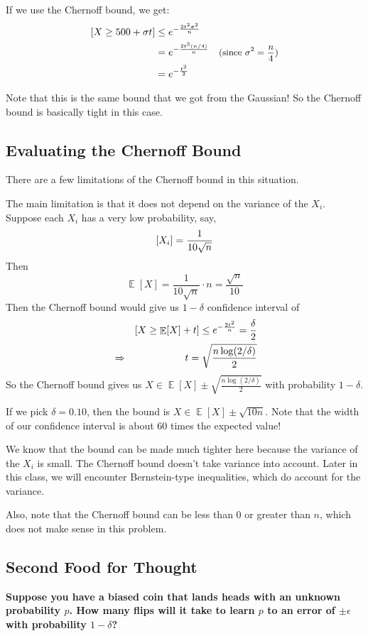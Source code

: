 \documentclass[11pt]{article}
\DeclareMathOperator*{\E}{\mathbb{E}}
\let\Pr\relax
\DeclareMathOperator*{\Pr}{\mathbb{P}}
\newcommand{\eps}{\epsilon}
\begin{document}
If we use the Chernoff bound, we get:
\begin{align*}
  \Pr[X \ge 500 + \sigma t]
    &\le e^{-\frac{2t^2\sigma^2}{n}} \\
    &= e^{-\frac{2t^2(n/4)}{n}} &\small\text{(since $\sigma^2 = \frac{n}{4}$)}\\
    &= e^{-\frac{t^2}{2}}
\end{align*}

Note that this is the same bound that we got from the Gaussian! So the Chernoff bound is basically tight in this case.

\subsection{Evaluating the Chernoff Bound}
There are a few limitations of the Chernoff bound in this situation.

The main limitation is that it does not depend on the variance of the $X_i$. Suppose each $X_i$ has a very low probability, say,
$$\Pr[X_i] = \frac{1}{10\sqrt{n}}$$
Then
$$ \E[X] = \frac{1}{10\sqrt{n}} \cdot n = \frac{\sqrt{n}}{10} $$
Then the Chernoff bound would give us $1 - \delta$ confidence interval of
\begin{align*}
  && \Pr[X \ge \E[X] + t] \le e^{-\frac{2t^2}{n}} = \frac{\delta}{2} \\
  &\Rightarrow &t = \sqrt{\frac{n\log(2/\delta)}{2}}
\end{align*}
So the Chernoff bound gives us $X \in \E[X] \pm \sqrt{\frac{n\log(2/\delta)}{2}}$ with probability $1 - \delta$.

If we pick $\delta = 0.10$, then the bound is $X \in \E[X] \pm \sqrt{10n}$. Note that the width of our confidence interval is about 60 times the expected value!

We know that the bound can be made much tighter here because the variance of the $X_i$ is small. The Chernoff bound doesn't take variance into account. Later in this class, we will encounter Bernstein-type inequalities, which do account for the variance.

Also, note that the Chernoff bound can be less than 0 or greater than $n$, which does not make sense in this problem.

\subsection{Second Food for Thought}
\textbf{Suppose you have a biased coin that lands heads with an unknown probability $p$. How many flips will it take to learn $p$ to an error of $\pm \eps$ with probability $1 - \delta$?}
\end{document}
